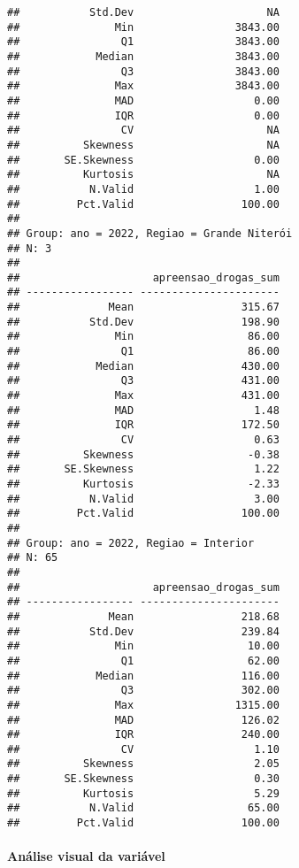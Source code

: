 \documentclass[
]{article}
\begin{document}
\begin{verbatim}
##           Std.Dev                     NA
##               Min                3843.00
##                Q1                3843.00
##            Median                3843.00
##                Q3                3843.00
##               Max                3843.00
##               MAD                   0.00
##               IQR                   0.00
##                CV                     NA
##          Skewness                     NA
##       SE.Skewness                   0.00
##          Kurtosis                     NA
##           N.Valid                   1.00
##         Pct.Valid                 100.00
## 
## Group: ano = 2022, Regiao = Grande Niterói  
## N: 3  
## 
##                     apreensao_drogas_sum
## ----------------- ----------------------
##              Mean                 315.67
##           Std.Dev                 198.90
##               Min                  86.00
##                Q1                  86.00
##            Median                 430.00
##                Q3                 431.00
##               Max                 431.00
##               MAD                   1.48
##               IQR                 172.50
##                CV                   0.63
##          Skewness                  -0.38
##       SE.Skewness                   1.22
##          Kurtosis                  -2.33
##           N.Valid                   3.00
##         Pct.Valid                 100.00
## 
## Group: ano = 2022, Regiao = Interior  
## N: 65  
## 
##                     apreensao_drogas_sum
## ----------------- ----------------------
##              Mean                 218.68
##           Std.Dev                 239.84
##               Min                  10.00
##                Q1                  62.00
##            Median                 116.00
##                Q3                 302.00
##               Max                1315.00
##               MAD                 126.02
##               IQR                 240.00
##                CV                   1.10
##          Skewness                   2.05
##       SE.Skewness                   0.30
##          Kurtosis                   5.29
##           N.Valid                  65.00
##         Pct.Valid                 100.00
\end{verbatim}

\hypertarget{anuxe1lise-visual-da-variuxe1vel}{%
\paragraph{Análise visual da variável}\label{anuxe1lise-visual-da-variuxe1vel}}
\end{document}

